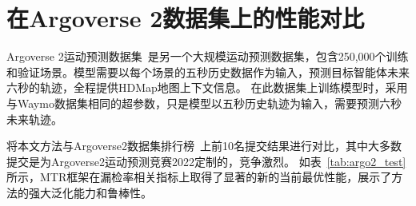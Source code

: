 \documentclass{article}
\begin{document}
	\section{在Argoverse 2数据集上的性能对比}\label{sec:argo2}
	Argoverse 2运动预测数据集~\cite{wilson2021argoverse}是另一个大规模运动预测数据集，包含250,000个训练和验证场景。模型需要以每个场景的五秒历史数据作为输入，预测目标智能体未来六秒的轨迹，全程提供HDMap地图上下文信息。
	在此数据集上训练模型时，采用与Waymo数据集相同的超参数，只是模型以五秒历史轨迹为输入，需要预测六秒未来轨迹。
	
	将本文方法与Argoverse2数据集排行榜~\cite{argo2_leaderboard}上前10名提交结果进行对比，其中大多数提交是为Argoverse2运动预测竞赛2022定制的，竞争激烈。
	如表~\ref{tab:argo2_test}所示，MTR框架在漏检率相关指标上取得了显著的新的当前最优性能，展示了方法的强大泛化能力和鲁棒性。
\end{document}
